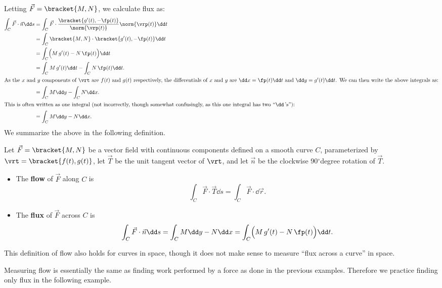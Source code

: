 Letting $\vec F =\bracket{M,N}$, we calculate flux as:
\begin{align*}
\int_C \vec F\cdot \vec n\dd s &= \int_C \vec F\cdot \frac{\bracket{g'(t),-\fp(t)}}{\norm{\vrp(t)}} \norm{\vrp(t)}\dd t \\
				&= \int_C\bracket{M,N}\cdot\bracket{g'(t),-\fp(t)}\dd t \\
				&= \int_C \Bigl(M\,g'(t) - N\,\fp(t)\Bigr)\dd t\\
				&= \int_C M\,g'(t)\dd t - \int_C N\,\fp(t)\dd t.\\
				\intertext{As the $x$ and $y$ components of $\vrt$ are $f(t)$ and $g(t)$ respectively, the differentials of $x$ and $y$ are $\dd x = \fp(t)\dd t$ and $\dd y=g'(t)\dd t$. We can then write the above integrals as:}
				&= \int_C M\dd y - \int_C N\dd x.\\
				\intertext{This is often written as one integral (not incorrectly, though somewhat confusingly, as this one integral has two ``$\dd$\,'s''):}
				&=\int_CM\dd y -N\dd x.
\end{align*}
We summarize the above in the following definition.

\begin{definition}\label{def:flowflux}
Let $\vec F=\bracket{M,N}$ be a vector field with continuous components defined on a smooth curve $C$, parameterized by $\vrt =\bracket{f(t),g(t)}$, let $\vec T$ be the unit tangent vector of $\vrt$, and let $\vec n$ be the clockwise 90$^\circ$degree rotation of $\vec T$.
\begin{itemize}
	\item The \textbf{flow} of $\vec F$ along $C$ is
\[\int_C \vec F\cdot\vec T\dd s=\int_C \vec F\cdot\dd\vec r.\]
	\item The \textbf{flux} of $\vec F$ across $C$ is
\[
\int_C \vec F\cdot \vec n\dd s =  \int_C M\dd y -N\dd x = \int_C\Bigl(M\,g'(t) - N\,\fp(t)\Bigr)\dd t.
\]
\end{itemize}
\end{definition}

This definition of flow also holds for curves in space, though it does not make sense to measure ``flux across a curve'' in space.

Measuring flow is essentially the same as finding work performed by a force as done in the previous examples. Therefore we practice finding only flux in the following example.

